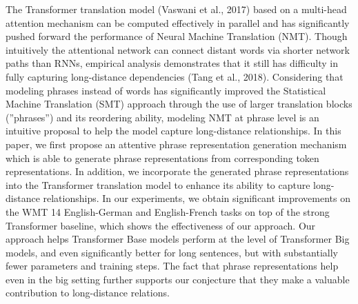 The Transformer translation model (Vaswani et al., 2017) based on a multi-head attention mechanism can be computed effectively in parallel and has significantly pushed forward the performance of Neural Machine Translation (NMT). Though intuitively the attentional network can connect distant words via shorter network paths than RNNs, empirical analysis demonstrates that it still has difficulty in fully capturing long-distance dependencies (Tang et al., 2018). Considering that modeling phrases instead of words has significantly improved the Statistical Machine Translation (SMT) approach through the use of larger translation blocks (''phrases'') and its reordering ability, modeling NMT at phrase level is an intuitive proposal to help the model capture long-distance relationships. In this paper, we first propose an attentive phrase representation generation mechanism which is able to generate phrase representations from corresponding token representations. In addition, we incorporate the generated phrase representations into the Transformer translation model to enhance its ability to capture long-distance relationships. In our experiments, we obtain significant improvements on the WMT 14 English-German and English-French tasks on top of the strong Transformer baseline, which shows the effectiveness of our approach. Our approach helps Transformer Base models perform at the level of Transformer Big models, and even significantly better for long sentences, but with substantially fewer parameters and training steps. The fact that phrase representations help even in the big setting further supports our conjecture that they make a valuable contribution to long-distance relations.
